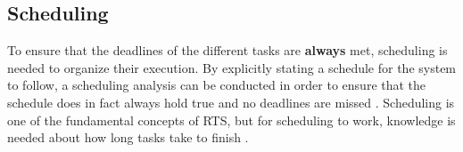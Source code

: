 \subsection{Scheduling}
To ensure that the deadlines of the different tasks are \textbf{always} met,
scheduling is needed to organize their execution. By explicitly stating a
schedule for the system to follow, a scheduling analysis can be conducted in
order to ensure that the schedule does in fact always hold true and no deadlines
are missed \Source. Scheduling is one of the fundamental concepts of RTS, but
for scheduling to work, knowledge is needed about how long tasks take to finish
\Source.\nl




